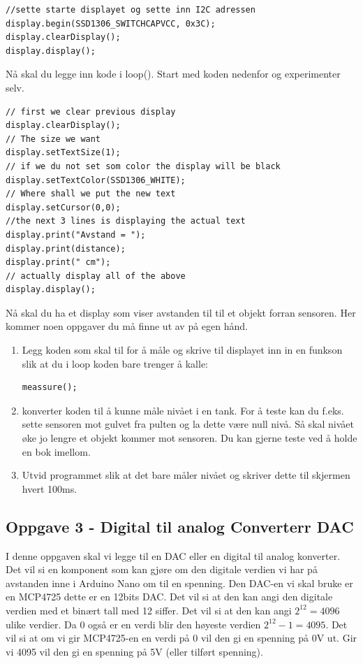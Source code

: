 \begin{lstlisting}[language=Arduino]
//sette starte displayet og sette inn I2C adressen
display.begin(SSD1306_SWITCHCAPVCC, 0x3C); 
display.clearDisplay();
display.display();
\end{lstlisting}
\newpage
Nå skal du legge inn kode i loop(). Start med koden nedenfor og experimenter selv. 
\begin{lstlisting}[language=Arduino]
// first we clear previous display
display.clearDisplay();
// The size we want
display.setTextSize(1);
// if we du not set som color the display will be black
display.setTextColor(SSD1306_WHITE);
// Where shall we put the new text
display.setCursor(0,0);
//the next 3 lines is displaying the actual text
display.print("Avstand = ");
display.print(distance);
display.print(" cm");
// actually display all of the above
display.display(); 
\end{lstlisting}

\vskip 5pt 
Nå skal du ha et display som viser avstanden til til et objekt forran sensoren. Her kommer noen oppgaver du må finne ut av på egen hånd.
\begin{enumerate}
	\item Legg koden som skal til for å måle og skrive til displayet inn in en funkson slik at du i loop koden bare trenger å kalle:
		\begin{lstlisting}[language=Arduino]
		meassure();
		\end{lstlisting}
	\item konverter koden til å kunne måle nivået i en tank. For å teste kan du f.eks. sette sensoren mot gulvet fra  pulten og la dette være null nivå. Så skal nivået øke jo lengre et objekt kommer mot sensoren. Du kan gjerne teste ved å holde en bok imellom. 
	\item Utvid programmet slik at det bare måler nivået og skriver dette til skjermen hvert 100ms. 
\end{enumerate}

\newpage
\subsection*{Oppgave 3 - Digital til analog Converterr DAC}
I denne oppgaven skal vi legge til en DAC eller en digital til analog konverter. Det vil si en komponent som kan gjøre om den digitale verdien vi har på avstanden inne i Arduino Nano om til en spenning. Den DAC-en vi skal bruke er en MCP4725 dette er en 12bits DAC. Det vil si at den kan angi den digitale verdien med et binært tall med 12 siffer. 
\vskip 5pt 
Det vil si at den kan angi $2^{12}=4096$ ulike verdier. Da 0 også er en verdi blir den høyeste verdien $2^{12}-1=4095$.  Det vil si at om vi gir MCP4725-en en verdi på 0 vil den gi en spenning på 0V ut. Gir vi 4095 vil den gi en spenning på 5V (eller tilført spenning).

